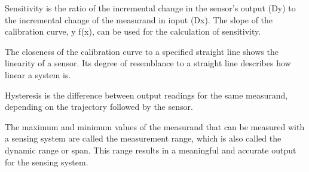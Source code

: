 Sensitivity is the ratio of the incremental change in the sensor’s output (Dy) to the incremental change of the measurand in input (Dx). The slope of the calibration curve, y f(x), can be used for the calculation of sensitivity.

The closeness of the calibration curve to a specified straight line shows the linearity of a sensor. Its degree of resemblance to a straight line describes how linear a system is.

Hysteresis is the difference between output readings for the same measurand, depending on the trajectory followed by the sensor.

The maximum and minimum values of the measurand that can be measured with a sensing system are called the measurement range, which is also called the dynamic range or span. This range results in a meaningful and accurate output for the sensing system. \cite{kalantar-zadeh_sensors_2013}




